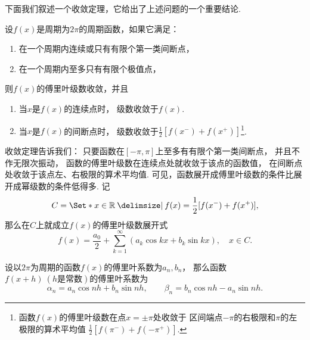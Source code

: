 下面我们叙述一个收敛定理，它给出了上述问题的一个重要结论.
\begin{theorem}\label{theorem:无穷级数.傅里叶级数收敛的狄利克雷充分条件}
设\(f(x)\)是周期为\(2 \pi\)的周期函数，如果它满足：
\begin{enumerate}
\item 在一个周期内连续或只有有限个第一类间断点，
\item 在一个周期内至多只有有限个极值点，
\end{enumerate}
则\(f(x)\)的傅里叶级数收敛，并且
\begin{enumerate}
\item 当\(x\)是\(f(x)\)的连续点时，
级数收敛于\(f(x)\).

\item 当\(x\)是\(f(x)\)的间断点时，
级数收敛于\(\frac{1}{2} [ f(x^-) + f(x^+) ]\)\footnote{%
函数\(f(x)\)的傅里叶级数在点\(x=\pm\pi\)处收敛于%
区间端点\(-\pi\)的右极限和\(\pi\)的左极限的算术平均值%
\(\frac{1}{2} [ f(\pi^-) + f(-\pi^+) ]\).}.
\end{enumerate}
\end{theorem}

收敛定理告诉我们：
只要函数在\([-\pi,\pi]\)上至多有有限个第一类间断点，
并且不作无限次振动，
函数的傅里叶级数在连续点处就收敛于该点的函数值，
在间断点处收敛于该点左、右极限的算术平均值.
可见，函数展开成傅里叶级数的条件比展开成幂级数的条件低得多.
记
\begin{equation}
	C = \Set*{
		x \in \mathbb{R}
		\given
		f(x) = \frac{1}{2} [ f(x^-) + f(x^+) ]
	},
\end{equation}
那么在\(C\)上就成立\(f(x)\)的傅里叶级数展开式\[
	f(x) = \frac{a_0}{2} + \sum\limits_{k=1}^\infty (a_k \cos{kx} + b_k \sin kx),
	\quad x \in C.
\]

\begin{theorem}
设以\(2\pi\)为周期的函数\(f(x)\)的傅里叶系数为\(a_n,b_n\)，
那么函数\(f(x+h)\ (h\text{是常数})\)的傅里叶系数为\[
\alpha_n
= a_n \cos nh + b_n \sin nh,
\qquad
\beta_n
= b_n \cos nh - a_n \sin nh.
\]
\end{theorem}

